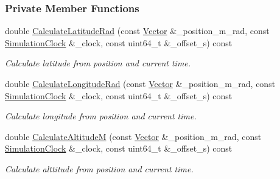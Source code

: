 \subsubsection*{Private Member Functions}
\begin{DoxyCompactItemize}
\item 
double \hyperlink{classosse_1_1collaborate_1_1_geodetic_a828ad6fbdcebe1ee5d7f8925d7423907}{Calculate\+Latitude\+Rad} (const \hyperlink{classosse_1_1collaborate_1_1_vector}{Vector} \&\+\_\+position\+\_\+m\+\_\+rad, const \hyperlink{classosse_1_1collaborate_1_1_simulation_clock}{Simulation\+Clock} \&\+\_\+clock, const uint64\+\_\+t \&\+\_\+offset\+\_\+s) const
\begin{DoxyCompactList}\small\item\em Calculate latitude from position and current time. \end{DoxyCompactList}\item 
double \hyperlink{classosse_1_1collaborate_1_1_geodetic_a66984db0ad32d1d761b57a2835b9ba7e}{Calculate\+Longitude\+Rad} (const \hyperlink{classosse_1_1collaborate_1_1_vector}{Vector} \&\+\_\+position\+\_\+m\+\_\+rad, const \hyperlink{classosse_1_1collaborate_1_1_simulation_clock}{Simulation\+Clock} \&\+\_\+clock, const uint64\+\_\+t \&\+\_\+offset\+\_\+s) const
\begin{DoxyCompactList}\small\item\em Calculate longitude from position and current time. \end{DoxyCompactList}\item 
double \hyperlink{classosse_1_1collaborate_1_1_geodetic_a9720fc55eb736812b81de9bfabb1d541}{Calculate\+AltitudeM} (const \hyperlink{classosse_1_1collaborate_1_1_vector}{Vector} \&\+\_\+position\+\_\+m\+\_\+rad, const \hyperlink{classosse_1_1collaborate_1_1_simulation_clock}{Simulation\+Clock} \&\+\_\+clock, const uint64\+\_\+t \&\+\_\+offset\+\_\+s) const
\begin{DoxyCompactList}\small\item\em Calculate alttitude from position and current time. \end{DoxyCompactList}\end{DoxyCompactItemize}
